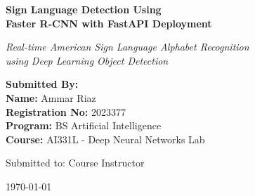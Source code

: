 \documentclass[12pt,a4paper]{article}
\begin{document}
\begin{titlepage}
    \centering
    \vspace*{1cm}
    
    
    \vspace{1.5cm}
    
    {\Huge\bfseries Sign Language Detection Using\\[0.3cm] Faster R-CNN with FastAPI Deployment\par}
    
    \vspace{1cm}
    
    {\Large\itshape Real-time American Sign Language Alphabet Recognition\\using Deep Learning Object Detection\par}
    
    \vspace{2cm}
    
    \begin{tcolorbox}[colback=blue!5!white,colframe=blue!75!black,width=0.7\textwidth]
        \centering
        \Large
        \textbf{Submitted By:}\\[0.3cm]
        \textbf{Name:} Ammar Riaz\\
        \textbf{Registration No:} 2023377\\
        \textbf{Program:} BS Artificial Intelligence\\[0.5cm]
        \textbf{Course:} AI331L - Deep Neural Networks Lab
    \end{tcolorbox}
    
    \vfill
    
    {\large Submitted to: Course Instructor\par}
    
    \vspace{1cm}
    
    {\large \today\par}
    
\end{titlepage}
\end{document}
